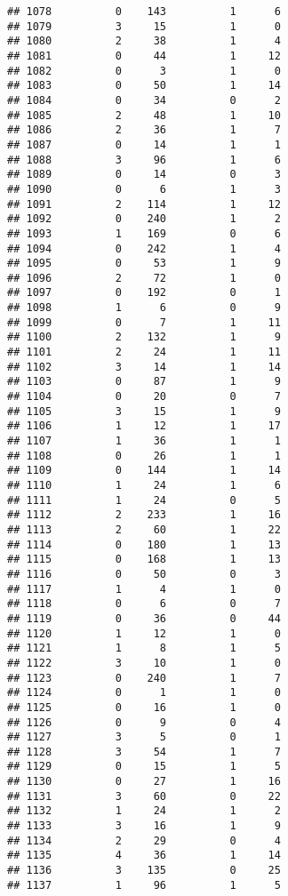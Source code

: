 \documentclass[]{article}
\begin{document}
\begin{verbatim}
## 1078          0    143          1      6
## 1079          3     15          1      0
## 1080          2     38          1      4
## 1081          0     44          1     12
## 1082          0      3          1      0
## 1083          0     50          1     14
## 1084          0     34          0      2
## 1085          2     48          1     10
## 1086          2     36          1      7
## 1087          0     14          1      1
## 1088          3     96          1      6
## 1089          0     14          0      3
## 1090          0      6          1      3
## 1091          2    114          1     12
## 1092          0    240          1      2
## 1093          1    169          0      6
## 1094          0    242          1      4
## 1095          0     53          1      9
## 1096          2     72          1      0
## 1097          0    192          0      1
## 1098          1      6          0      9
## 1099          0      7          1     11
## 1100          2    132          1      9
## 1101          2     24          1     11
## 1102          3     14          1     14
## 1103          0     87          1      9
## 1104          0     20          0      7
## 1105          3     15          1      9
## 1106          1     12          1     17
## 1107          1     36          1      1
## 1108          0     26          1      1
## 1109          0    144          1     14
## 1110          1     24          1      6
## 1111          1     24          0      5
## 1112          2    233          1     16
## 1113          2     60          1     22
## 1114          0    180          1     13
## 1115          0    168          1     13
## 1116          0     50          0      3
## 1117          1      4          1      0
## 1118          0      6          0      7
## 1119          0     36          0     44
## 1120          1     12          1      0
## 1121          1      8          1      5
## 1122          3     10          1      0
## 1123          0    240          1      7
## 1124          0      1          1      0
## 1125          0     16          1      0
## 1126          0      9          0      4
## 1127          3      5          0      1
## 1128          3     54          1      7
## 1129          0     15          1      5
## 1130          0     27          1     16
## 1131          3     60          0     22
## 1132          1     24          1      2
## 1133          3     16          1      9
## 1134          2     29          0      4
## 1135          4     36          1     14
## 1136          3    135          0     25
## 1137          1     96          1      5

\end{verbatim}
\end{document}
